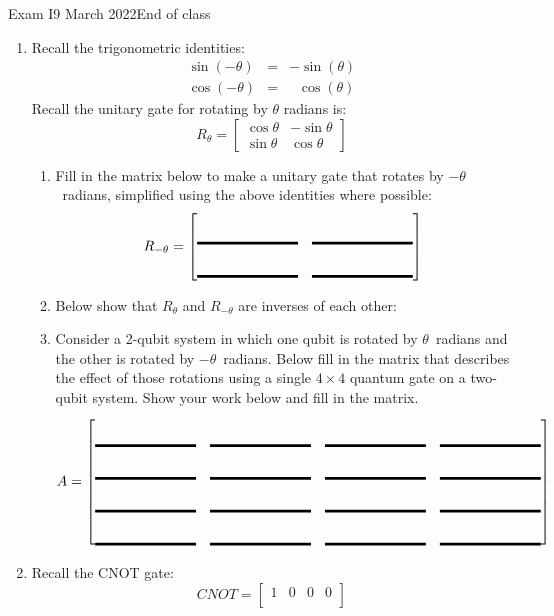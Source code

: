 \documentclass[12pt]{article}
\newcommand{\Blank}[1][1in]{\mbox{\vrule width #1 depth 2pt}\vrule width 0pt height 2.0em}
\begin{document}
\begin{assignment}{Exam I}{9 March 2022}{End of class}
\begin{enumerate}
\begin{enumerate}
  \item{} Can this be factored into the tensor product of two
qubits?\Blank{}
  \item{} Prove or disprove your claim below:
\LeaveSpace{2cm}
\end{enumerate}
\clearpage\item{}
Recall the trigonometric identities:
\begin{eqnarray*}
   \sin(-\theta) & = & -\sin(\theta) \\
   \cos(-\theta) & = & \ \ \,\cos(\theta)
\end{eqnarray*}
Recall the unitary gate for rotating by $\theta$ radians is:
\[
R_{\theta}=
\begin{bmatrix}
\cos{\theta} & -\sin{\theta} \\
\sin{\theta} & \cos{\theta}
\end{bmatrix}
\]
\begin{enumerate}
  \item{} Fill in the matrix below to make a unitary gate that
rotates by $-\theta$~radians, simplified using the above identities where
possible:
\[
R_{-\theta}=
\begin{bmatrix}
\Blank{} & \Blank{} \\
\Blank{} & \Blank{} 
\end{bmatrix}
\]
\item{} Below show that $R_\theta$ and $R_{-\theta}$ are inverses
of each other:
\LeaveSpace{2cm}
\item{} Consider a 2-qubit system in which one qubit is rotated by
$\theta$~radians and the other is rotated by $-\theta$~radians.
Below fill in the matrix that describes the effect of those rotations using
a single $4\times4$ quantum gate on a two-qubit system.  Show your work below and
fill in the matrix.
\LeaveSpace{4cm}
\[
A=
\begin{bmatrix}
\Blank{} & \Blank{} & \Blank{} & \Blank{}  \\
\Blank{} & \Blank{} & \Blank{} & \Blank{}  \\
\Blank{} & \Blank{} & \Blank{} & \Blank{}  \\
\Blank{} & \Blank{} & \Blank{} & \Blank{} 
\end{bmatrix}
\]
\end{enumerate}
\clearpage\item{}
Recall the CNOT gate:
\[
CNOT =
\begin{bmatrix}
1 & 0 & 0 & 0 \\

\end{bmatrix}\]
\end{enumerate}
\end{assignment}
\end{document}
